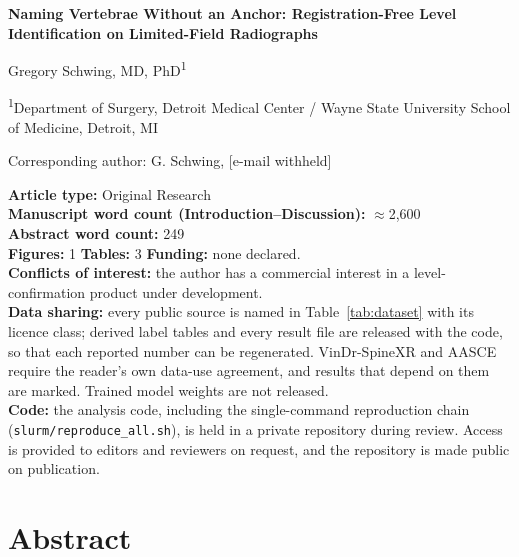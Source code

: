 \documentclass[11pt,letterpaper]{article}
\begin{document}
\begin{titlepage}
\begin{center}
{\Large\bfseries Naming Vertebrae Without an Anchor: Registration-Free Level Identification on Limited-Field Radiographs\par}
\vspace{1em}
{\normalsize Gregory Schwing, MD, PhD\textsuperscript{1}\par}
\vspace{0.5em}
{\small \textsuperscript{1}Department of Surgery, Detroit Medical Center / Wayne State University School of Medicine, Detroit, MI\par}
\vspace{1em}
{\small Corresponding author: G. Schwing, [e-mail withheld]\par}
\end{center}
\vspace{1em}
\noindent\textbf{Article type:} Original Research\\
\textbf{Manuscript word count (Introduction--Discussion):} $\approx$2,600\\
\textbf{Abstract word count:} 249\\
\textbf{Figures:} 1 \quad \textbf{Tables:} 3 \quad \textbf{Funding:} none declared.\\
\textbf{Conflicts of interest:} the author has a commercial interest in a level-confirmation product under development.\\
\textbf{Data sharing:} every public source is named in Table~\ref{tab:dataset} with its licence class; derived label tables and every result file are released with the code, so that each reported number can be regenerated. VinDr-SpineXR and AASCE require the reader's own data-use agreement, and results that depend on them are marked. Trained model weights are not released.\\
\textbf{Code:} the analysis code, including the single-command reproduction chain (\texttt{slurm/reproduce\_all.sh}), is held in a private repository during review. Access is provided to editors and reviewers on request, and the repository is made public on publication.
\end{titlepage}

\section*{Abstract}
\end{document}
